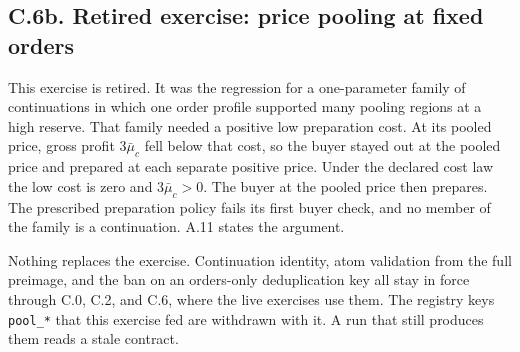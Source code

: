 \subsection{C.6b. Retired exercise: price pooling at fixed orders}\label{oa-c-price-pools}

This exercise is retired. It was the regression for a one-parameter family of
continuations in which one order profile supported many pooling regions at a
high reserve. That family needed a positive low preparation cost.
At its pooled price, gross profit \(3\bar\mu_c\) fell below that cost, so the
buyer stayed out at the pooled price and prepared at each separate positive price.
Under the declared cost law the low cost is zero and \(3\bar\mu_c>0\).
The buyer at the pooled price then prepares. The prescribed preparation policy
fails its first buyer check, and no member of the family is a continuation.
A.11 states the argument.

Nothing replaces the exercise. Continuation identity, atom validation from the
full preimage, and the ban on an orders-only deduplication key all stay in force
through C.0, C.2, and C.6, where the live exercises use them.
The registry keys \texttt{pool\_*} that this exercise fed are withdrawn with it.
A run that still produces them reads a stale contract.
